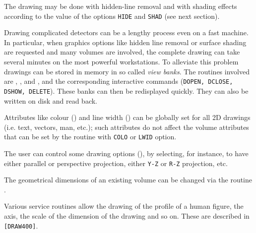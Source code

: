 The drawing may be done with hidden-line removal
and with shading effects according to the value of the options {\tt HIDE}
and {\tt SHAD} (see next section).

Drawing complicated detectors can be a lengthy process even on a fast machine.
In particular,
when graphics options like hidden line removal or surface shading
are requested and many volumes are involved, the complete drawing can take
several minutes on the most powerful workstations. To alleviate this problem
drawings can be stored in memory in so called {\it view banks}. The routines
involved are , ,  and , 
and the corresponding interactive commands ({\tt DOPEN, DCLOSE, DSHOW, 
DELETE}). These banks can then be redisplayed quickly. They can also be 
written on disk and read back.

Attributes like colour () and line width () can be
globally set for all 2D drawings (i.e. text, vectors, man, etc.);
such attributes do not affect the volume attributes that can be set by
the  routine with {\tt COLO} or {\tt LWID} option.

The user can control some drawing options (), by selecting,
for instance, to have either parallel or perspective projection,
either {\tt Y-Z} or {\tt R-Z} projection, etc.
 
The geometrical dimensions of an existing volume can be changed via the
routine .
 
Various service routines allow the drawing of the 
profile of a human figure, the
axis, the scale of the dimension of the drawing and so on. These are 
described in {\tt [DRAW400]}.

